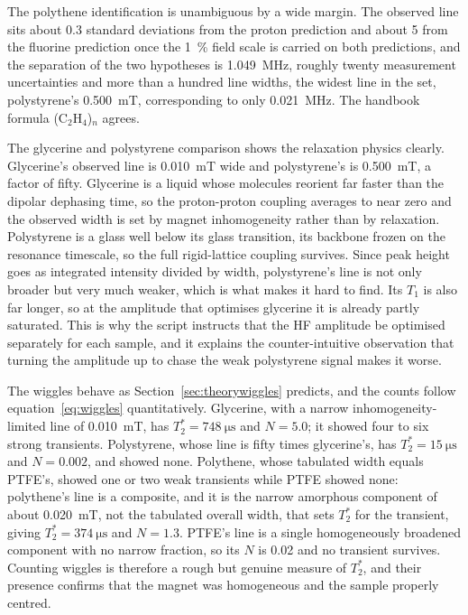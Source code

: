 \documentclass[11pt,a4paper]{article}
\begin{document}
The polythene identification is unambiguous by a wide margin. The observed line sits about 0.3
standard deviations from the proton prediction and about 5 from the fluorine prediction once the
\SI{1}{\percent} field scale is carried on both predictions, and the separation of the
two hypotheses is \SI{1.049}{\mega\hertz}, roughly twenty measurement uncertainties and more than
a hundred line widths, the widest line in the set, polystyrene's \SI{0.500}{\milli\tesla},
corresponding to only \SI{0.021}{\mega\hertz}. The handbook formula (C$_2$H$_4$)$_n$
\cite{crc} agrees.

The glycerine and polystyrene comparison shows the relaxation physics clearly. Glycerine's
observed line is \SI{0.010}{\milli\tesla} wide and polystyrene's is \SI{0.500}{\milli\tesla},
a factor of fifty. Glycerine is a liquid whose molecules reorient far faster than the
dipolar dephasing time, so the proton-proton coupling averages to near zero and the observed width
is set by magnet inhomogeneity rather than by relaxation. Polystyrene is a glass well below its
glass transition, its backbone frozen on the resonance timescale, so the full rigid-lattice
coupling survives. Since peak height goes as integrated intensity divided by width, polystyrene's
line is not only broader but very much weaker, which is what makes it hard to find. Its $T_1$ is
also far longer, so at the amplitude that optimises glycerine it is already partly saturated. This
is why the script instructs that the HF amplitude be optimised separately for each sample, and it
explains the counter-intuitive observation that turning the amplitude up to chase the weak
polystyrene signal makes it worse.

The wiggles behave as Section~\ref{sec:theorywiggles} predicts, and the counts follow
equation~\eqref{eq:wiggles} quantitatively. Glycerine, with a narrow inhomogeneity-limited line of
\SI{0.010}{\milli\tesla}, has $T_2^{*} = \SI{748}{\micro\second}$ and $N = 5.0$; it showed four to
six strong transients. Polystyrene, whose line is fifty times glycerine's, has
$T_2^{*} = \SI{15}{\micro\second}$ and $N = 0.002$, and showed none. Polythene, whose tabulated
width equals PTFE's, showed one or two weak transients while PTFE showed none: polythene's line is
a composite, and it is the narrow amorphous component of about \SI{0.020}{\milli\tesla}, not the
tabulated overall width, that sets $T_2^{*}$ for the transient, giving
$T_2^{*} = \SI{374}{\micro\second}$ and $N = 1.3$. PTFE's line is a single homogeneously broadened
component with no narrow fraction, so its $N$ is 0.02 and no transient survives. Counting wiggles
is therefore a rough but genuine measure of $T_2^{*}$, and their presence confirms that the magnet
was homogeneous and the sample properly centred.
\end{document}

